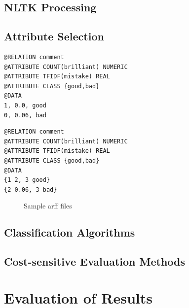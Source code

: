 \documentclass[article,type=msc,colorback,accentcolor=tud7b]{tudthesis}
\begin{document}
  \subsection{NLTK Processing}
  \label{subsec:nltk_processing}    
   
  \subsection{Attribute Selection}

    
    \newsavebox{\complete}
      \begin{lrbox}{\complete}
        \begin{lstlisting}
@RELATION comment
@ATTRIBUTE COUNT(brilliant) NUMERIC
@ATTRIBUTE TFIDF(mistake) REAL
@ATTRIBUTE CLASS {good,bad}
@DATA
1, 0.0, good
0, 0.06, bad	  
        \end{lstlisting}
      \end{lrbox}
    \newsavebox{\sparse}
      \begin{lrbox}{\sparse}
        \begin{lstlisting}
@RELATION comment
@ATTRIBUTE COUNT(brilliant) NUMERIC
@ATTRIBUTE TFIDF(mistake) REAL
@ATTRIBUTE CLASS {good,bad}
@DATA
{1 2, 3 good}
{2 0.06, 3 bad}	  
        \end{lstlisting}
      \end{lrbox}    
    
    \begin{figure}[H]
	  \centering      
	  \subfloat[complete]{\usebox{\complete}}
	  \quad
	  \subfloat[sparse]{\usebox{\sparse}}
      \caption{Sample arff files}
      \label{fig:sample_arff_files}
	\end{figure}
    
    
  \subsection{Classification Algorithms}
  
    
  \subsection{Cost-sensitive Evaluation Methods}    
  \label{subsec:cost_sensitive_evaluation_methods}

  \clearpage  
  
  \section{Evaluation of Results}
  \label{sec:evaluation_of_results}
  
\end{document}
